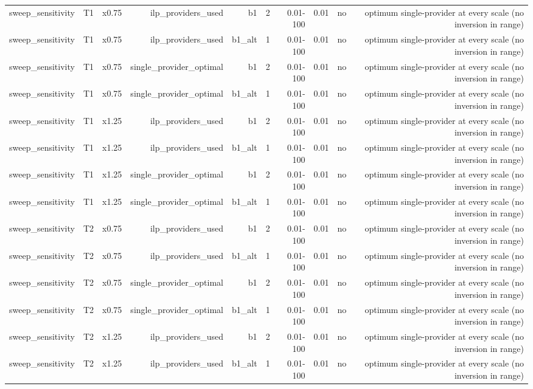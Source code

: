 \begin{table}[t]
\begin{tabular}{lrrrrrrrrr}
sweep\_sensitivity & T1 & x0.75 & ilp\_providers\_used & b1 & 2 & 0.01-100 & 0.01 & no & optimum single-provider at every scale (no inversion in range) \\
sweep\_sensitivity & T1 & x0.75 & ilp\_providers\_used & b1\_alt & 1 & 0.01-100 & 0.01 & no & optimum single-provider at every scale (no inversion in range) \\
sweep\_sensitivity & T1 & x0.75 & single\_provider\_optimal & b1 & 2 & 0.01-100 & 0.01 & no & optimum single-provider at every scale (no inversion in range) \\
sweep\_sensitivity & T1 & x0.75 & single\_provider\_optimal & b1\_alt & 1 & 0.01-100 & 0.01 & no & optimum single-provider at every scale (no inversion in range) \\
sweep\_sensitivity & T1 & x1.25 & ilp\_providers\_used & b1 & 2 & 0.01-100 & 0.01 & no & optimum single-provider at every scale (no inversion in range) \\
sweep\_sensitivity & T1 & x1.25 & ilp\_providers\_used & b1\_alt & 1 & 0.01-100 & 0.01 & no & optimum single-provider at every scale (no inversion in range) \\
sweep\_sensitivity & T1 & x1.25 & single\_provider\_optimal & b1 & 2 & 0.01-100 & 0.01 & no & optimum single-provider at every scale (no inversion in range) \\
sweep\_sensitivity & T1 & x1.25 & single\_provider\_optimal & b1\_alt & 1 & 0.01-100 & 0.01 & no & optimum single-provider at every scale (no inversion in range) \\
sweep\_sensitivity & T2 & x0.75 & ilp\_providers\_used & b1 & 2 & 0.01-100 & 0.01 & no & optimum single-provider at every scale (no inversion in range) \\
sweep\_sensitivity & T2 & x0.75 & ilp\_providers\_used & b1\_alt & 1 & 0.01-100 & 0.01 & no & optimum single-provider at every scale (no inversion in range) \\
sweep\_sensitivity & T2 & x0.75 & single\_provider\_optimal & b1 & 2 & 0.01-100 & 0.01 & no & optimum single-provider at every scale (no inversion in range) \\
sweep\_sensitivity & T2 & x0.75 & single\_provider\_optimal & b1\_alt & 1 & 0.01-100 & 0.01 & no & optimum single-provider at every scale (no inversion in range) \\
sweep\_sensitivity & T2 & x1.25 & ilp\_providers\_used & b1 & 2 & 0.01-100 & 0.01 & no & optimum single-provider at every scale (no inversion in range) \\
sweep\_sensitivity & T2 & x1.25 & ilp\_providers\_used & b1\_alt & 1 & 0.01-100 & 0.01 & no & optimum single-provider at every scale (no inversion in range) \\

\end{tabular}
\end{table}
